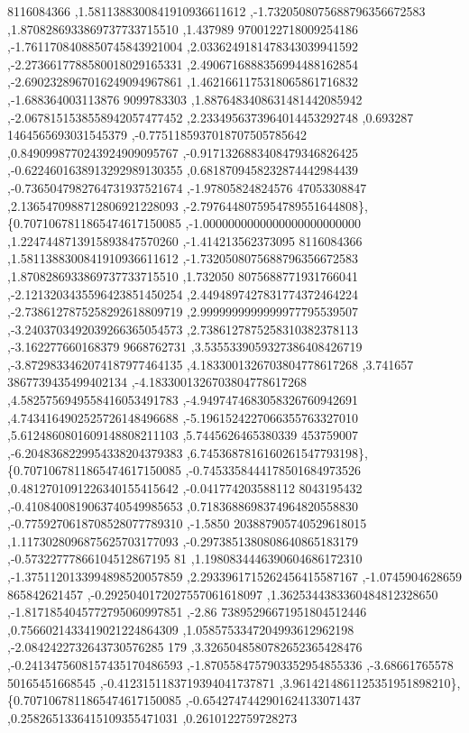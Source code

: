 \begin{DoxyCode}
      8116084366 ,1.5811388300841910936611612 ,-1.7320508075688796356672583 ,1.8708286933869737733715510 ,1.437989
      9700122718009254186 ,-1.7611708408850745843921004 ,2.0336249181478343039941592 ,-2.2736617788580018029165331
       ,2.4906716888356994488162854 ,-2.6902328967016249094967861 ,1.4621661175318065861716832 ,-1.688364003113876
      9099783303 ,1.8876483408631481442085942 ,-2.0678151538558942057477452 ,2.2334956373964014453292748 ,0.693287
      1464565693031545379 ,-0.7751185937018707505785642 ,0.8490998770243924909095767 ,-0.9171326883408479346826425
       ,-0.6224601638913292989130355 ,0.6818709458232874442984439 ,-0.7365047982764731937521674 ,-1.97805824824576
      47053308847 ,2.1365470988712806921228093 ,-2.7976448075954789551644808\},
\{0.7071067811865474617150085 ,-1.0000000000000000000000000 ,1.2247448713915893847570260 ,-1.414213562373095
      8116084366 ,1.5811388300841910936611612 ,-1.7320508075688796356672583 ,1.8708286933869737733715510 ,1.732050
      8075688771931766041 ,-2.1213203435596423851450254 ,2.4494897427831774372464224 ,-2.7386127875258292618809719
       ,2.9999999999999977795539507 ,-3.2403703492039266365054573 ,2.7386127875258310382378113 ,-3.162277660168379
      9668762731 ,3.5355339059327386408426719 ,-3.8729833462074187977464135 ,4.1833001326703804778617268 ,3.741657
      3867739435499402134 ,-4.1833001326703804778617268 ,4.5825756949558416053491783 ,-4.9497474683058326760942691
       ,4.7434164902525726148496688 ,-5.1961524227066355763327010 ,5.6124860801609148808211103 ,5.7445626465380339
      453759007 ,-6.2048368229954338204379383 ,6.7453687816160261547793198\},
\{0.7071067811865474617150085 ,-0.7453358444178501684973526 ,0.4812701091226340155415642 ,-0.041774203588112
      8043195432 ,-0.4108400819063740549985653 ,0.7183688698374964820558830 ,-0.7759270618708528077789310 ,-1.5850
      203887905740529618015 ,1.1173028096875625703177093 ,-0.2973851380808640865183179 ,-0.57322777866104512867195
      81 ,1.1980834446390604686172310 ,-1.3751120133994898520057859 ,2.2933961715262456415587167 ,-1.0745904628659
      865842621457 ,-0.2925040172027557061618097 ,1.3625344383360484812328650 ,-1.8171854045772795060997851 ,-2.86
      73895296671951804512446 ,0.7566021433419021224864309 ,1.0585753347204993612962198 ,-2.0842422732643730576285
      179 ,3.3265048580782652365428476 ,-0.2413475608157435170486593 ,-1.8705584757903352954855336 ,-3.68661765578
      50165451668545 ,-0.4123151183719394041737871 ,3.9614214861125351951898210\},
\{0.7071067811865474617150085 ,-0.6542747442901624133071437 ,0.2582651336415109355471031 ,0.2610122759728273

\end{DoxyCode}
